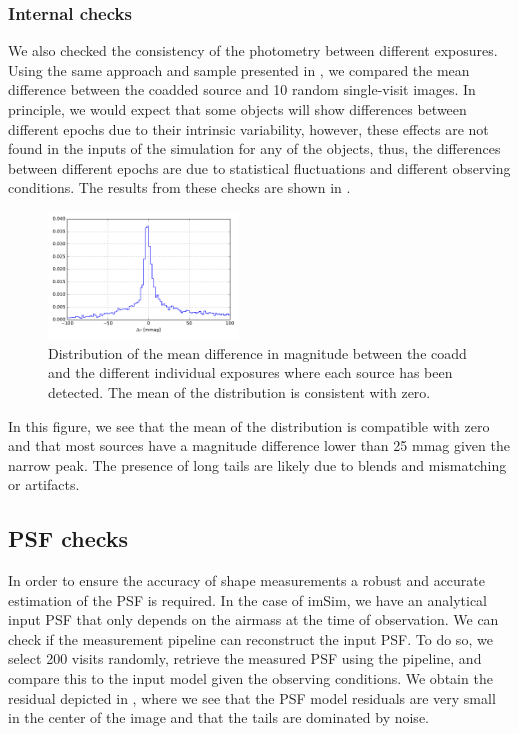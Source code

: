 \documentclass[twocolumn]{aastex62}
\begin{document}
\subsubsection{Internal checks}
\label{sec:internal_photometry}

We also checked the consistency of the photometry between different exposures. Using the same approach and sample presented in
, we compared the mean difference between the coadded source and 10 random single-visit images. In
principle, we would expect that some objects will show differences between different epochs due to their intrinsic variability, however,
these effects are not found in the inputs of the simulation for any of the objects, thus, the differences between different epochs are due to
statistical fluctuations and different observing conditions. The results from these checks are shown in .

\begin{figure}
  \centering
  \includegraphics[width=0.45\textwidth]{photometry_internal_10visits_imsim_undithered}
  \caption{Distribution of the mean difference in magnitude between the coadd and the different individual exposures
  where each source has been detected. The mean of the distribution is consistent with zero.}
  \label{fig:internal_photometry_a}
\end{figure}

In this figure, we see that the mean of the distribution is compatible with zero and that most sources have a magnitude difference lower
than 25 mmag given the narrow peak. The presence of long tails are likely due to blends and mismatching or artifacts.

\subsection{PSF checks}
\label{sec:psf_checks}

In order to ensure the accuracy of shape measurements a robust and accurate estimation of the PSF is required. In the case of imSim, we have
an analytical input PSF that only depends on the airmass at the time of observation. We can check if the measurement pipeline can reconstruct
the input PSF. To do so, we select 200 visits randomly, retrieve the measured PSF using the pipeline, and compare this
to the input model given the observing conditions. We obtain the residual depicted in , where we see that the PSF model residuals are very small in the center of the image and that the tails are dominated by noise.
\end{document}
